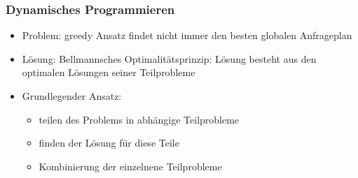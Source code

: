 \documentclass[a4paper]{article}
\begin{document}
    \subsubsection{Dynamisches Programmieren}
     \begin{itemize}
         \item Problem: greedy Ansatz findet nicht immer den besten globalen Anfrageplan
         \item Lösung: Bellmannsches Optimalitätsprinzip: Lösung besteht aus den optimalen Lösungen seiner Teilprobleme
         \item Grundlegender Ansatz:
         \begin{itemize}
             \item teilen des Problems in abhängige Teilprobleme
             \item finden der Lösung für diese Teile
             \item Kombinierung der einzelnene Teilprobleme 
         \end{itemize}
     \end{itemize}
\end{document}
